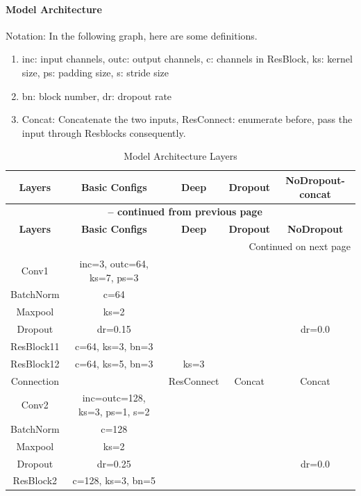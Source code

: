 \documentclass[a4 paper,12pt]{article}
\theoremstyle{definitionstyle}
\begin{document}
\paragraph{Model Architecture}
Notation: In the following graph, here are some definitions.
\begin{enumerate}
    \item inc: input channels, outc: output channels, c: channels in ResBlock, ks: kernel size, ps: padding size, s: stride size
    \item bn: block number, dr: dropout rate
    \item Concat: Concatenate the two inputs, ResConnect: enumerate before, pass the input through Resblocks consequently.
\end{enumerate}
\begin{longtable}{|c|c|c|c|c|}
    \caption{Model Architecture Layers} \label{tab:model_architecture} \\
    \hline
    \textbf{Layers} & \textbf{Basic Configs} & \textbf{Deep} & \textbf{Dropout} & \textbf{NoDropout-concat} \\
    \hline
    \endfirsthead
    \multicolumn{5}{c}{{\bfseries \tablename\ \thetable{} -- continued from previous page}} \\
    \hline
    \textbf{Layers} & \textbf{Basic Configs} & \textbf{Deep} & \textbf{Dropout} & \textbf{NoDropout} \\
    \hline
    \endhead
    \hline \multicolumn{5}{|r|}{{Continued on next page}} \\ \hline
    \endfoot
    \hline
    \endlastfoot
    Conv1 & inc=3, outc=64, ks=7, ps=3  & & & \\
    BatchNorm & c=64 & & & \\
    Maxpool & ks=2 & & & \\
    Dropout & dr=0.15 & & & dr=0.0\\
    \hline
    ResBlock11 & c=64, ks=3, bn=3 & & & \\
    ResBlock12 & c=64, ks=5, bn=3 & ks=3 & & \\
    Connection & & ResConnect & Concat & Concat\\
    \hline
    Conv2 & inc=outc=128, ks=3, ps=1, s=2 & & & \\      
    BatchNorm & c=128 & & & \\
    Maxpool & ks=2 & & & \\
    Dropout & dr=0.25 & & & dr=0.0\\
    \hline
    ResBlock2 & c=128, ks=3, bn=5 & & & \\

\end{longtable}
\end{document}
